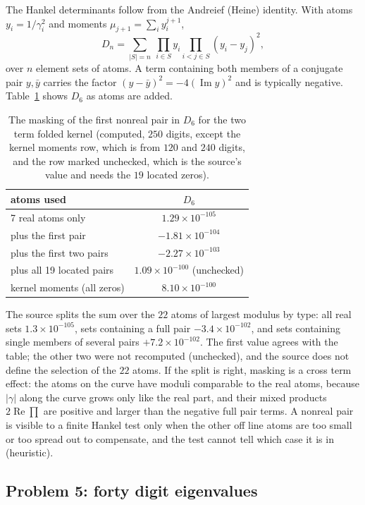 The Hankel determinants follow from the Andreief (Heine) identity. With atoms $y_i=1/\gamma_i^2$ and moments $\mu_{j+1}=\sum_iy_i^{j+1}$,
\[
D_n=\sum_{|S|=n}\ \prod_{i\in S}y_i\prod_{i<j\in S}(y_i-y_j)^2,
\]
over $n$ element sets of atoms. A term containing both members of a conjugate pair $y,\bar y$ carries the factor $(y-\bar y)^2=-4(\operatorname{Im}y)^2$ and is typically negative. Table~\ref{ev:tab:mask} shows $D_6$ as atoms are added.

\begin{table}[h]\centering\small
\begin{tabular}{lc}
\toprule
atoms used & $D_6$\\
\midrule
7 real atoms only & $1.29\times10^{-105}$\\
plus the first pair & $-1.81\times10^{-104}$\\
plus the first two pairs & $-2.27\times10^{-103}$\\
plus all 19 located pairs & $1.09\times10^{-100}$ (unchecked)\\
kernel moments (all zeros) & $8.10\times10^{-100}$\\
\bottomrule
\end{tabular}
\caption{The masking of the first nonreal pair in $D_6$ for the two term folded kernel (computed, $250$ digits, except the kernel moments row, which is from $120$ and $240$ digits, and the row marked unchecked, which is the source's value and needs the $19$ located zeros).}\label{ev:tab:mask}
\end{table}

The source splits the sum over the $22$ atoms of largest modulus by type: all real sets $1.3\times10^{-105}$, sets containing a full pair $-3.4\times10^{-102}$, and sets containing single members of several pairs $+7.2\times10^{-102}$. The first value agrees with the table; the other two were not recomputed (unchecked), and the source does not define the selection of the $22$ atoms. If the split is right, masking is a cross term effect: the atoms on the curve have moduli comparable to the real atoms, because $|\gamma|$ along the curve grows only like the real part, and their mixed products $2\operatorname{Re}\prod$ are positive and larger than the negative full pair terms. A nonreal pair is visible to a finite Hankel test only when the other off line atoms are too small or too spread out to compensate, and the test cannot tell which case it is in (heuristic).

\subsection{Problem 5: forty digit eigenvalues}

